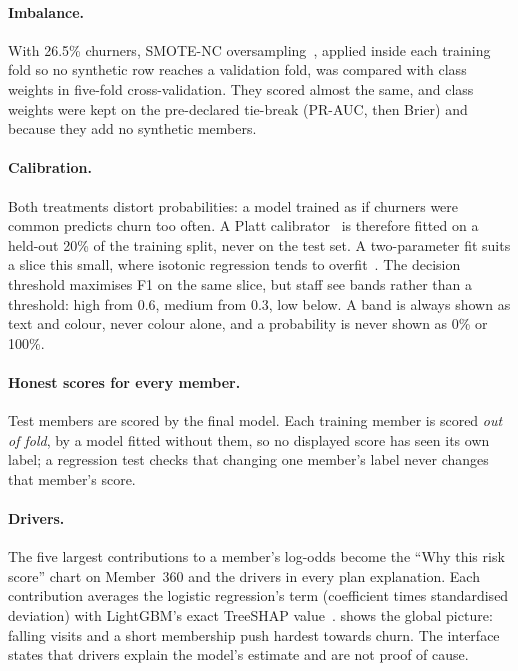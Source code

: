 \paragraph{Imbalance.} With 26.5\% churners, SMOTE-NC oversampling~\cite{chawla2002smote}, applied inside each training fold so no synthetic row reaches a validation fold, was compared with class weights in five-fold cross-validation. They scored almost the same, and class weights were kept on the pre-declared tie-break (PR-AUC, then Brier) and because they add no synthetic members.

\paragraph{Calibration.} Both treatments distort probabilities: a model trained as if churners were common predicts churn too often. A Platt calibrator~\cite{platt1999probabilistic} is therefore fitted on a held-out 20\% of the training split, never on the test set. A two-parameter fit suits a slice this small, where isotonic regression tends to overfit~\cite{niculescu2005probabilities}. The decision threshold maximises F1 on the same slice, but staff see bands rather than a threshold: high from 0.6, medium from 0.3, low below. A band is always shown as text and colour, never colour alone, and a probability is never shown as 0\% or 100\%.

\paragraph{Honest scores for every member.} Test members are scored by the final model. Each training member is scored \emph{out of fold}, by a model fitted without them, so no displayed score has seen its own label; a regression test checks that changing one member's label never changes that member's score.

\paragraph{Drivers.} The five largest contributions to a member's log-odds become the \enquote{Why this risk score} chart on Member~360 and the drivers in every plan explanation. Each contribution averages the logistic regression's term (coefficient times standardised deviation) with LightGBM's exact TreeSHAP value~\cite{lundberg2017shap,lundberg2020trees}.  shows the global picture: falling visits and a short membership push hardest towards churn. The interface states that drivers explain the model's estimate and are not proof of cause.

